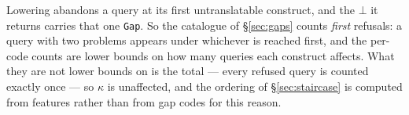 \begin{remark}\label{rem:one-gap}
Lowering abandons a query at its first untranslatable construct, and the
$\bot$ it returns carries that one \texttt{Gap}. So the catalogue of
\S\ref{sec:gaps} counts \emph{first} refusals: a query with two problems appears under
whichever is reached first, and the per-code counts are lower bounds on how many queries
each construct affects. What they are not lower bounds on is the total --- every refused
query is counted exactly once --- so $\kappa$ is unaffected, and the ordering of
\S\ref{sec:staircase} is computed from features rather than from gap codes for this
reason.
\end{remark}
